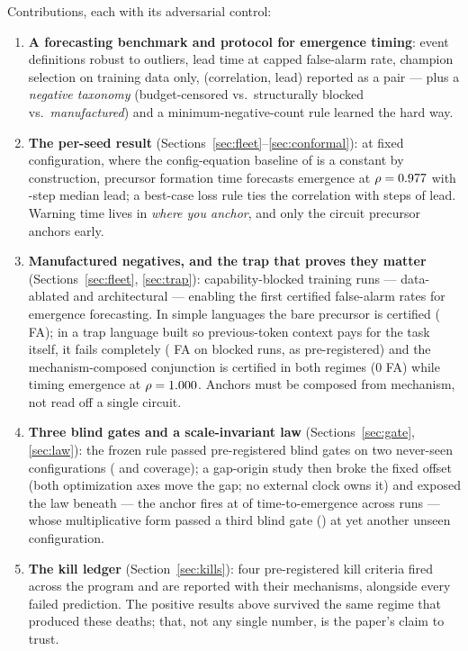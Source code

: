 \documentclass[11pt]{article}
\begin{document}
Contributions, each with its adversarial control:
\begin{enumerate}
\item \textbf{A forecasting benchmark and protocol for emergence timing}: event
  definitions robust to outliers, lead time at capped false-alarm rate, champion
  selection on training data only, (correlation, lead) reported as a pair --- plus a
  \emph{negative taxonomy} (budget-censored vs.\ structurally blocked vs.\
  \emph{manufactured}) and a minimum-negative-count rule learned the hard way.
\item \textbf{The per-seed result} (Sections~\ref{sec:fleet}--\ref{sec:conformal}): at
  fixed configuration, where the config-equation baseline of
  \citet{aoyama2025predicting} is a constant by construction, precursor formation time
  forecasts emergence at $\rho=0.977$ with \wLeadMed-step median lead; a best-case loss
  rule ties the correlation with \wLossLeadMed{} steps of lead. Warning time lives in
  \emph{where you anchor}, and only the circuit precursor anchors early.
\item \textbf{Manufactured negatives, and the trap that proves they matter}
  (Sections~\ref{sec:fleet}, \ref{sec:trap}): capability-blocked training runs ---
  data-ablated and architectural --- enabling the first certified false-alarm rates for
  emergence forecasting. In simple languages the bare precursor is certified
  (\wBareFA{} FA); in a trap language built so previous-token context pays for the task
  itself, it fails completely (\wTrapBareFA{} FA on blocked runs, as pre-registered) and
  the mechanism-composed conjunction is certified in both regimes (0 FA) while timing
  emergence at $\rho = 1.000$. Anchors must be composed from mechanism, not read
  off a single circuit.
\item \textbf{Three blind gates and a scale-invariant law} (Sections~\ref{sec:gate},
  \ref{sec:law}): the frozen rule passed pre-registered blind gates on two never-seen
  configurations (\wGateCover{} and \wGateCcover{} coverage); a gap-origin study then
  broke the fixed offset (both optimization axes move the gap; no external clock owns
  it) and exposed the law beneath --- the anchor fires at \wLawFrac{} of
  time-to-emergence across \wLawN{} runs --- whose multiplicative form passed a third
  blind gate (\wNineCover) at yet another unseen configuration.
\item \textbf{The kill ledger} (Section~\ref{sec:kills}): four pre-registered kill
  criteria fired across the program and are reported with their mechanisms, alongside
  every failed prediction. The positive results above survived the same regime that
  produced these deaths; that, not any single number, is the paper's claim to trust.
\end{enumerate}
\end{document}

